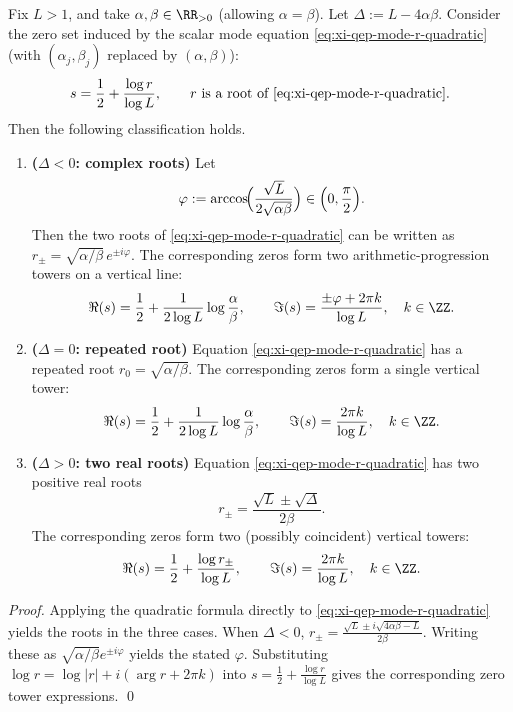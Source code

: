 \begin{theorem}\label{thm:xi-qep-scalar-mode-tower-classification}
Fix \(L>1\), and take \(\alpha,\beta\in\RR_{>0}\) (allowing \(\alpha=\beta\)).
Let \(\Delta:=L-4\alpha\beta\).
Consider the zero set induced by the scalar mode equation \eqref{eq:xi-qep-mode-r-quadratic} (with \((\alpha_j,\beta_j)\) replaced by \((\alpha,\beta)\)):
\[
s=\frac12+\frac{\log r}{\log L},
\qquad r\ \text{is a root of \eqref{eq:xi-qep-mode-r-quadratic}}.
\]
Then the following classification holds.
\begin{enumerate}
  \item \textbf{(\(\Delta<0\): complex roots)}
  Let
  \[
  \varphi:=\arccos\!\Bigl(\frac{\sqrt L}{2\sqrt{\alpha\beta}}\Bigr)\in\Bigl(0,\frac{\pi}{2}\Bigr).
  \]
  Then the two roots of \eqref{eq:xi-qep-mode-r-quadratic} can be written as
  \(
  r_{\pm}=\sqrt{\alpha/\beta}\,e^{\pm i\varphi}
  \).
  The corresponding zeros form two arithmetic-progression towers on a vertical line:
  \[
  \Re(s)=\frac12+\frac{1}{2\log L}\log\frac{\alpha}{\beta},
  \qquad
  \Im(s)=\frac{\pm\varphi+2\pi k}{\log L},
  \quad k\in\ZZ.
  \]
  \item \textbf{(\(\Delta=0\): repeated root)}
  Equation \eqref{eq:xi-qep-mode-r-quadratic} has a repeated root \(r_0=\sqrt{\alpha/\beta}\).
  The corresponding zeros form a single vertical tower:
  \[
  \Re(s)=\frac12+\frac{1}{2\log L}\log\frac{\alpha}{\beta},
  \qquad
  \Im(s)=\frac{2\pi k}{\log L},
  \quad k\in\ZZ.
  \]
  \item \textbf{(\(\Delta>0\): two real roots)}
  Equation \eqref{eq:xi-qep-mode-r-quadratic} has two positive real roots
  \[
  r_{\pm}=\frac{\sqrt L\pm\sqrt{\Delta}}{2\beta}.
  \]
  The corresponding zeros form two (possibly coincident) vertical towers:
  \[
  \Re(s)=\frac12+\frac{\log r_{\pm}}{\log L},
  \qquad
  \Im(s)=\frac{2\pi k}{\log L},
  \quad k\in\ZZ.
  \]
\end{enumerate}
\end{theorem}

\begin{proof}
Applying the quadratic formula directly to \eqref{eq:xi-qep-mode-r-quadratic} yields the roots in the three cases.
When \(\Delta<0\),
\(
r_{\pm}=\frac{\sqrt L\pm i\sqrt{4\alpha\beta-L}}{2\beta}
\).
Writing these as \(\sqrt{\alpha/\beta}e^{\pm i\varphi}\) yields the stated \(\varphi\).
Substituting \(\log r=\log|r|+i(\arg r+2\pi k)\) into \(s=\frac12+\frac{\log r}{\log L}\) gives the corresponding zero tower expressions. \qed
\end{proof}


